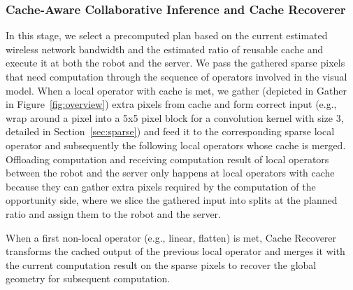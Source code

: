 \subsubsection{Cache-Aware Collaborative Inference and Cache Recoverer}
In this stage, we select a precomputed plan based on the current estimated wireless network bandwidth and the estimated ratio of reusable cache and execute it at both the robot and the server.
We pass the gathered sparse pixels that need computation through the sequence of operators involved in the visual model.
When a local operator with cache is met, we gather (depicted in Gather in Figure~\ref{fig:overview}) extra pixels from cache and form correct input (e.g., wrap around a pixel into a 5x5 pixel block for a convolution kernel with size 3, detailed in Section~\ref{sec:sparse}) and feed it to the corresponding sparse local operator and subsequently the following local operators whose cache is merged.
Offloading computation and receiving computation result of local operators between the robot and the server only happens at local operators with cache because they can gather extra pixels required by the computation of the opportunity side, where we slice the gathered input into splits at the planned ratio and assign them to the robot and the server.

When a first non-local operator (e.g., linear, flatten) is met, Cache Recoverer transforms the cached output of the previous local operator and merges it with the current computation result on the sparse pixels to recover the global geometry for subsequent computation.







